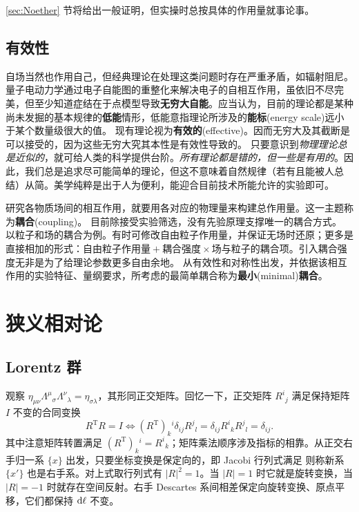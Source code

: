 \ref{sec:Noether} 节将给出一般证明，但实操时总按具体的作用量就事论事。

\subsection{有效性}

自场当然也作用自己，但经典理论在处理这类问题时存在严重矛盾，如辐射阻尼。量子电动力学通过电子自能图的重整化来解决电子的自相互作用，虽依旧不尽完美，但至少知道症结在于点模型导致\textbf{无穷大自能}。应当认为，目前的理论都是某种尚未发掘的基本规律的\textbf{低能}情形，低能意指理论所涉及的\textbf{能标}(energy scale)远小于某个数量级很大的值。
现有理论视为\textbf{有效的}(effective)。因而无穷大及其截断是可以接受的，因为这些无穷大究其本性是有效性导致的。
只要意识到\textit{物理理论总是近似的}，就可给人类的科学提供台阶。\textit{所有理论都是错的，但一些是有用的}。因此，我们总是追求尽可能简单的理论，但这不意味着自然规律（若有且能被人总结）从简。美学纯粹是出于人为便利，能迎合目前技术所能允许的实验即可。

研究各物质场间的相互作用，就要用各对应的物理量来构建总作用量。这一主题称为\textbf{耦合}(coupling)。
目前除接受实验筛选，没有先验原理支撑唯一的耦合方式。
以粒子和场的耦合为例。有时可修改自由粒子作用量，并保证无场时还原；更多是直接相加的形式：$\text{自由粒子作用量}+\textbf{耦合强度}\times\text{场与粒子的耦合项}$。引入耦合强度无非是为了给理论参数更多自由余地。
从有效性和对称性出发，并依据该相互作用的实验特征、量纲要求，所考虑的最简单耦合称为\textbf{最小}(minimal)\textbf{耦合}。

\section{狭义相对论}
\subsection{Lorentz 群}
观察 $\eta_{\mu\nu}\Lambda^{\mu}{}_{\sigma}{\Lambda^{\nu}}_{\lambda}={\eta}_{\sigma\lambda}$，其形同正交矩阵。回忆一下，正交矩阵 $R^i{}_j$ 满足保持矩阵 $I$ 不变的合同变换
\[
    R^\mathrm{T} R = I\iff (R^\mathrm{T})_k{}^i\delta_{ij} R^j{}_l=\delta_{ij}R^i{}_k R^j{}_l=\delta_{ij}.
\]
其中注意矩阵转置满足 $(R^\mathrm{T})_k{}^i=R^i{}_k$；矩阵乘法顺序涉及指标的相靠。从正交右手归一系 $\{x\}$ 出发，只要坐标变换是保定向的，即 Jacobi 行列式满足
则称新系 $\{x'\}$ 也是右手系。对上式取行列式有  $|R|^2=1$。当 $|R|=1$ 时它就是旋转变换，当 $|R|=-1$ 时就存在空间反射。右手 Descartes 系间相差保定向旋转变换、原点平移，它们都保持 $\dd\ell$ 不变。

